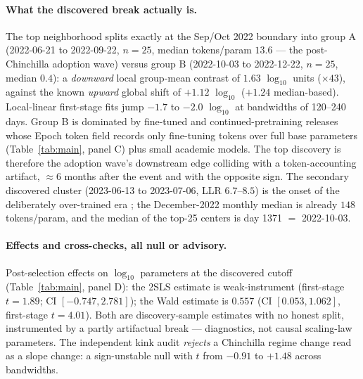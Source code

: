 \documentclass[11pt]{article}
\begin{document}
\paragraph{What the discovered break actually is.} The top neighborhood
splits exactly at the Sep/Oct 2022 boundary into group A (2022-06-21 to
2022-09-22, $n=25$, median tokens/param $13.6$ --- the post-Chinchilla
adoption wave) versus group B (2022-10-03 to 2022-12-22, $n=25$, median
$0.4$): a \emph{downward} local group-mean contrast of $1.63$ $\log_{10}$
units ($\times 43$), against the known \emph{upward} global shift of $+1.12$
$\log_{10}$ ($+1.24$ median-based). Local-linear first-stage fits jump
$-1.7$ to $-2.0$ $\log_{10}$ at bandwidths of 120--240 days. Group B is
dominated by fine-tuned and continued-pretraining releases whose Epoch token
field records only fine-tuning tokens over full base parameters
(Table~\ref{tab:main}, panel C) plus small academic models. The top
discovery is therefore the adoption wave's downstream edge colliding with a
token-accounting artifact, ${\approx}6$ months after the event and with the
opposite sign. The secondary discovered cluster (2023-06-13 to 2023-07-06,
LLR $6.7$--$8.5$) is the onset of the deliberately over-trained era
\cite{touvron2023,sardana2024}; the December-2022 monthly median is already
$148$ tokens/param, and the median of the top-25 centers is day 1371 $=$
2022-10-03.

\paragraph{Effects and cross-checks, all null or advisory.} Post-selection
effects on $\log_{10}$ parameters at the discovered cutoff
(Table~\ref{tab:main}, panel D): the 2SLS estimate is weak-instrument
(first-stage $t = 1.89$; CI $[-0.747, 2.781]$); the Wald estimate is
$0.557$ (CI $[0.053, 1.062]$, first-stage $t = 4.01$). Both are
discovery-sample estimates with no honest split, instrumented by a partly
artifactual break --- diagnostics, not causal scaling-law parameters. The
independent kink audit \emph{rejects} a Chinchilla regime change read as a
slope change: a sign-unstable null with $t$ from $-0.91$ to $+1.48$ across
bandwidths.
\end{document}
